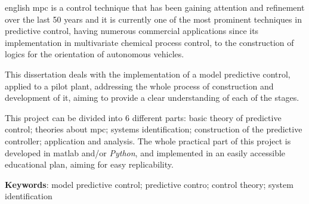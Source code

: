 \setlength{\absparsep}{18pt} %
\begin{resumo}[Abstract]
  \begin{otherlanguage*}{english}
    \acrshort{mpc} is a control technique that has been gaining attention and refinement over the last 50 years
    and it is currently one of the most prominent techniques in predictive control, having numerous
    commercial applications since its implementation in multivariate chemical process control,
    to the construction of logics for the orientation of autonomous vehicles.
    
    This dissertation deals with the implementation of a model predictive control, applied
    to a pilot plant, addressing the whole process of construction and development of it,
    aiming to provide a clear understanding of each of the stages.
    
    This project can be divided into 6 different parts: basic theory of predictive control;
    theories about \acrshort{mpc}; systems identification; construction of the predictive controller;
    application and analysis. The whole practical part of this project is developed in \acrshort{matlab}
    and/or \textit{Python}, and implemented in an easily accessible educational plan, aiming for
    easy replicability.

    \vspace{\onelineskip}

    \noindent 
    \textbf{Keywords}: model predictive control; predictive contro; control theory; system identification
  \end{otherlanguage*}
\end{resumo}